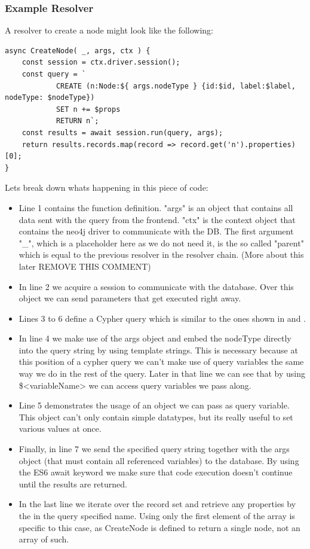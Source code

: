 \subsubsection{Example Resolver}
A resolver to create a node might look like the following:

\begin{lstlisting}[caption={A Basic Resolver},label={ex241}]
async CreateNode( _, args, ctx ) { 
	const session = ctx.driver.session(); 
	const query = ` 
			CREATE (n:Node:${ args.nodeType } {id:$id, label:$label, nodeType: $nodeType}) 
			SET n += $props 
			RETURN n`; 
	const results = await session.run(query, args);
	return results.records.map(record => record.get('n').properties)[0]; 
}
\end{lstlisting}

Lets break down whats happening in this piece of code:
\begin{itemize}
\item Line 1 contains the function definition. "args" is an object that contains all data sent with the query from the frontend. "ctx" is the context object that contains the neo4j driver to communicate with the DB. The first argument "\_", which is a placeholder here as we do not need it, is the so called "parent" which is equal to the previous resolver in the resolver chain. (More about this later REMOVE THIS COMMENT)
\item In line 2 we acquire a session to communicate with the database. \cite{Neo4jDriver} Over this object we can send parameters that get executed right away.
\item Lines 3 to 6 define a Cypher query which is similar to the ones shown in  and . 
\item In line 4 we make use of the args object and embed the nodeType directly into the query string by using template strings. This is necessary because at this position of a cypher query we can't make use of query variables the same way we do in the rest of the query. Later in that line we can see that by using \$<variableName> we can access query variables we pass along.
\item Line 5 demonstrates the usage of an object we can pass as query variable. This object can't only contain simple datatypes, but its really useful to set various values at once.
\item Finally, in line 7 we send the specified query string together with the args object (that must contain all referenced variables) to the database. By using the ES6 await keyword we make sure that code execution doesn't continue until the results are returned.
\item In the last line we iterate over the record set and retrieve any properties by the in the query specified name. Using only the first element of the array is specific to this case, as CreateNode is defined to return a single node, not an array of such.
\end{itemize}

